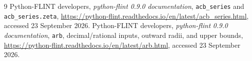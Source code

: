 \begin{thebibliography}{9}
Python-FLINT developers, \emph{python-flint 0.9.0 documentation},
\texttt{acb\_\allowbreak series} and \texttt{acb\_\allowbreak series.zeta},
\url{https://python-flint.readthedocs.io/en/latest/acb_series.html},
accessed 23 September 2026.
Python-FLINT developers, \emph{python-flint 0.9.0 documentation},
\texttt{arb}, decimal/rational inputs, outward radii, and upper bounds,
\url{https://python-flint.readthedocs.io/en/latest/arb.html},
accessed 23 September 2026.
\end{thebibliography}
